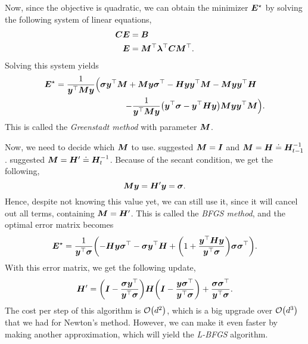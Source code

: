 Now, since the objective is quadratic, we can obtain the minimizer $\bm{E}^\star$ by solving the
following system of linear equations,
\begin{align*}
    \bm{C} \bm{E} & = \bm{B}                                                                    \\
    \bm{E}         & = \bm{M}^\top \bm{\lambda}^\top \bm{C} \bm{M}^\top.
\end{align*}
Solving this system yields
\begin{align*}
    \mat{E}^\star = \frac{1}{\transpose{\vec{y}} \mat{M} \vec{y}} \Big( \vec{\sigma} \transpose{\vec{y}} \mat{M} + \mat{M} \vec{y} \transpose{\vec{\sigma}} - \mat{H} \vec{y} \transpose{\vec{y}} \mat{M} - \mat{M} \vec{y} \transpose{\vec{y}} \mat{H} \quad & \\
    - \frac{1}{\transpose{\vec{y}} \mat{M} \vec{y}} \lft( \transpose{\vec{y}} \vec{\sigma} - \transpose{\vec{y}} \mat{H} \vec{y} \rgt) \mat{M} \vec{y} \transpose{\vec{y}} \mat{M} \Big).                                                                     &
\end{align*}
This is called the \textit{Greenstadt method} with parameter $\bm{M}$.

Now, we need to decide which $\bm{M}$ to use. \cite{greenstadt1970variations} suggested $\bm{M} =
    \bm{I}$ and $\bm{M} = \bm{H} \doteq \bm{H}^{-1}_{t-1}$. \cite{goldfarb1970family} suggested
$\bm{M} = \bm{H}' \doteq \bm{H}^{-1}_t$. Because of the secant condition, we get the following, \[
    \bm{M} \bm{y} = \bm{H}' \bm{y} = \bm{\sigma}.
\]
Hence, despite not knowing this value yet, we can still use it, since it will cancel out all terms,
containing $\bm{M} = \bm{H}'$. This is called the \textit{BFGS method}, and the optimal error
matrix becomes \[
    \mat{E}^\star = \frac{1}{\transpose{\vec{y}} \vec{\sigma}} \lft( - \mat{H} \vec{y} \transpose{\vec{\sigma}} - \vec{\sigma} \transpose{\vec{y}} \mat{H} + \lft( 1 + \frac{\transpose{\vec{y}} \mat{H} \vec{y}}{\transpose{\vec{y}} \vec{\sigma}} \rgt) \vec{\sigma} \transpose{\vec{\sigma}} \rgt).
\]
With this error matrix, we get the following update, \[
    \mat{H}' = \lft( \mat{I} - \frac{\vec{\sigma} \transpose{\vec{y}}}{\transpose{\vec{y}}\vec{\sigma}} \rgt) \mat{H} \lft( \mat{I} - \frac{\vec{y} \transpose{\vec{\sigma}}}{\transpose{\vec{y}} \vec{\sigma}} \rgt) + \frac{\vec{\sigma} \transpose{\vec{\sigma}}}{\transpose{\vec{y}} \vec{\sigma}}.
\]
The cost per step of this algorithm is $\bigo{d^2}$, which is a big upgrade over $\bigo{d^3}$ that
we had for Newton's method. However, we can make it even faster by making another approximation,
which will yield the \textit{L-BFGS} algorithm.

